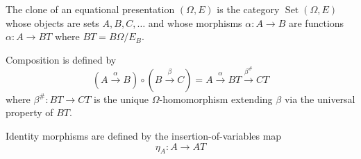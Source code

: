The clone of an equational presentation $(\Omega, E)$ is the category $\operatorname{Set}(\Omega, E)$ whose objects are sets $A, B, C, \ldots$ and whose morphisms $\alpha: A \longrightarrow B$ are functions $\alpha: A \longrightarrow BT$ where $BT = B\Omega / E_B$.

Composition is defined by
$$(A \xrightarrow{\alpha} B) \circ (B \xrightarrow{\beta} C) = A \xrightarrow{\alpha} BT \xrightarrow{\beta^\#} CT$$
where $\beta^\#: BT \longrightarrow CT$ is the unique $\Omega$-homomorphism extending $\beta$ via the universal property of $BT$.

Identity morphisms are defined by the insertion-of-variables map
$$\eta_A: A \longrightarrow AT$$
